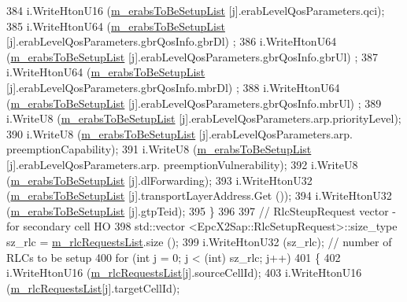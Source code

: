 \begin{DoxyCode}
384       i.WriteHtonU16 (\hyperlink{classns3_1_1EpcX2HandoverRequestHeader_a201338ba8572bf4c8b88e5bc79ba1153}{m\_erabsToBeSetupList} [j].erabLevelQosParameters.qci);
385       i.WriteHtonU64 (\hyperlink{classns3_1_1EpcX2HandoverRequestHeader_a201338ba8572bf4c8b88e5bc79ba1153}{m\_erabsToBeSetupList} [j].erabLevelQosParameters.gbrQosInfo.gbrDl)
      ;
386       i.WriteHtonU64 (\hyperlink{classns3_1_1EpcX2HandoverRequestHeader_a201338ba8572bf4c8b88e5bc79ba1153}{m\_erabsToBeSetupList} [j].erabLevelQosParameters.gbrQosInfo.gbrUl)
      ;
387       i.WriteHtonU64 (\hyperlink{classns3_1_1EpcX2HandoverRequestHeader_a201338ba8572bf4c8b88e5bc79ba1153}{m\_erabsToBeSetupList} [j].erabLevelQosParameters.gbrQosInfo.mbrDl)
      ;
388       i.WriteHtonU64 (\hyperlink{classns3_1_1EpcX2HandoverRequestHeader_a201338ba8572bf4c8b88e5bc79ba1153}{m\_erabsToBeSetupList} [j].erabLevelQosParameters.gbrQosInfo.mbrUl)
      ;
389       i.WriteU8 (\hyperlink{classns3_1_1EpcX2HandoverRequestHeader_a201338ba8572bf4c8b88e5bc79ba1153}{m\_erabsToBeSetupList} [j].erabLevelQosParameters.arp.priorityLevel);
390       i.WriteU8 (\hyperlink{classns3_1_1EpcX2HandoverRequestHeader_a201338ba8572bf4c8b88e5bc79ba1153}{m\_erabsToBeSetupList} [j].erabLevelQosParameters.arp.
      preemptionCapability);
391       i.WriteU8 (\hyperlink{classns3_1_1EpcX2HandoverRequestHeader_a201338ba8572bf4c8b88e5bc79ba1153}{m\_erabsToBeSetupList} [j].erabLevelQosParameters.arp.
      preemptionVulnerability);
392       i.WriteU8 (\hyperlink{classns3_1_1EpcX2HandoverRequestHeader_a201338ba8572bf4c8b88e5bc79ba1153}{m\_erabsToBeSetupList} [j].dlForwarding);
393       i.WriteHtonU32 (\hyperlink{classns3_1_1EpcX2HandoverRequestHeader_a201338ba8572bf4c8b88e5bc79ba1153}{m\_erabsToBeSetupList} [j].transportLayerAddress.Get ());
394       i.WriteHtonU32 (\hyperlink{classns3_1_1EpcX2HandoverRequestHeader_a201338ba8572bf4c8b88e5bc79ba1153}{m\_erabsToBeSetupList} [j].gtpTeid);
395     \}
396 
397   \textcolor{comment}{// RlcSteupRequest vector - for secondary cell HO}
398   std::vector <EpcX2Sap::RlcSetupRequest>::size\_type sz\_rlc = \hyperlink{classns3_1_1EpcX2HandoverRequestHeader_ac480cbca8380b8667096efeac4e2fa0c}{m\_rlcRequestsList}.size (); 
399   i.WriteHtonU32 (sz\_rlc);              \textcolor{comment}{// number of RLCs to be setup}
400   \textcolor{keywordflow}{for} (\textcolor{keywordtype}{int} j = 0; j < (int) sz\_rlc; j++)
401   \{
402     i.WriteHtonU16 (\hyperlink{classns3_1_1EpcX2HandoverRequestHeader_ac480cbca8380b8667096efeac4e2fa0c}{m\_rlcRequestsList}[j].sourceCellId);
403     i.WriteHtonU16 (\hyperlink{classns3_1_1EpcX2HandoverRequestHeader_ac480cbca8380b8667096efeac4e2fa0c}{m\_rlcRequestsList}[j].targetCellId); 

\end{DoxyCode}
